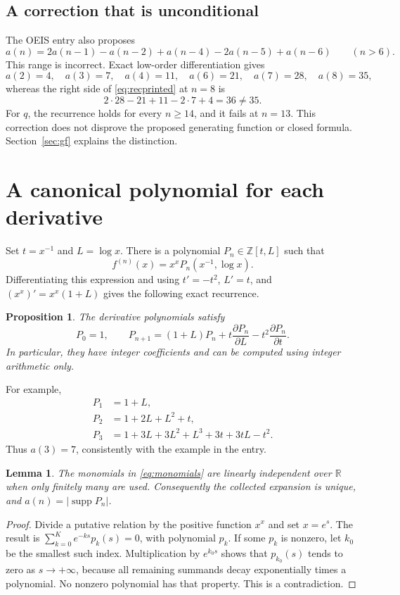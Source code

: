 \documentclass[11pt,a4paper]{article}
\numberwithin{equation}{section}
\newtheorem{proposition}[theorem]{Proposition}
\newtheorem{lemma}[theorem]{Lemma}
\theoremstyle{definition}
\theoremstyle{remark}
\newcommand{\Z}{\mathbb Z}
\newcommand{\R}{\mathbb R}
\DeclareMathOperator{\supp}{supp}
\begin{document}
\subsection{A correction that is unconditional}
The OEIS entry also proposes
\begin{equation}\label{eq:recprinted}
 a(n)=2a(n-1)-a(n-2)+a(n-4)-2a(n-5)+a(n-6)\qquad(n>6).
\end{equation}
This range is incorrect. Exact low-order differentiation gives
\[
 a(2)=4,\quad a(3)=7,\quad a(4)=11,\quad a(6)=21,\quad
 a(7)=28,\quad a(8)=35,
\]
whereas the right side of \eqref{eq:recprinted} at $n=8$ is
\[
 2\cdot28-21+11-2\cdot7+4=36\ne35.
\]
For $q$, the recurrence holds for every $n\ge14$, and it fails at $n=13$.
This correction does not disprove the proposed generating function or
closed formula. Section~\ref{sec:gf} explains the distinction.

\section{A canonical polynomial for each derivative}

Set $t=x^{-1}$ and $L=\log x$. There is a polynomial $P_n\in\Z[t,L]$ such that
\begin{equation}\label{eq:Pdefinition}
 f^{(n)}(x)=x^x P_n(x^{-1},\log x).
\end{equation}
Differentiating this expression and using $t'=-t^2$, $L'=t$, and
$(x^x)'=x^x(1+L)$ gives the following exact recurrence.

\begin{proposition}\label{prop:Prec}
The derivative polynomials satisfy
\begin{equation}\label{eq:Prec}
 P_0=1,\qquad P_{n+1}=(1+L)P_n+t\frac{\partial P_n}{\partial L}
                         -t^2\frac{\partial P_n}{\partial t}.
\end{equation}
In particular, they have integer coefficients and can be computed using
integer arithmetic only.
\end{proposition}

For example,
\begin{align*}
 P_1&=1+L,\\
 P_2&=1+2L+L^2+t,\\
 P_3&=1+3L+3L^2+L^3+3t+3tL-t^2.
\end{align*}
Thus $a(3)=7$, consistently with the example in the entry.

\begin{lemma}\label{lem:independence}
The monomials in \eqref{eq:monomials} are linearly independent over $\R$
when only finitely many are used. Consequently the collected expansion is
unique, and $a(n)=|\supp P_n|$.
\end{lemma}
\begin{proof}
Divide a putative relation by the positive function $x^x$ and set $x=e^s$.
The result is $\sum_{k=0}^K e^{-ks}p_k(s)=0$, with polynomial $p_k$.
If some $p_k$ is nonzero, let $k_0$ be the smallest such index. Multiplication
by $e^{k_0s}$ shows that $p_{k_0}(s)$ tends to zero as $s\to+\infty$, because
all remaining summands decay exponentially times a polynomial. No nonzero
polynomial has that property. This is a contradiction.
\end{proof}
\end{document}
